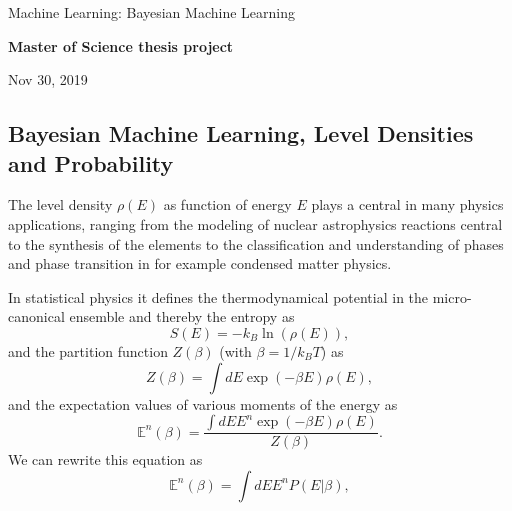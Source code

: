 \documentclass[%
oneside,                 %
final,                   %
10pt]{article}
\begin{document}

\newcommand{\exercisesection}[1]{\subsection*{#1}}






\thispagestyle{empty}

\begin{center}
{\LARGE\bf
\begin{spacing}{1.25}
Machine Learning: Bayesian Machine Learning
\end{spacing}
}
\end{center}


\begin{center}
{\bf Master of Science thesis project${}^{}$} \\ [0mm]
\end{center}

\begin{center}
\end{center}
    

\begin{center}
Nov 30, 2019
\end{center}

\vspace{1cm}


\subsection*{Bayesian Machine Learning, Level Densities and Probability}

The level density $\rho(E)$ as function of energy $E$ plays a central in many
physics applications, ranging from the modeling of nuclear
astrophysics reactions central to the synthesis of the elements to the
classification and understanding of phases and phase transition in for example condensed matter
physics.

In statistical physics it defines the thermodynamical potential in the micro-canonical ensemble and thereby the entropy as
\[
S(E) = -k_B \ln{(\rho(E))},
\]
and the partition function $Z(\beta)$ (with $\beta = 1/k_BT$)  as
\[
Z(\beta) = \int dE \exp{(-\beta E)}\rho(E),
\]
and the expectation values of various moments of the energy
as
\[
\mathbb{E}^n(\beta) = \frac{\int dE E^n\exp{(-\beta E)}\rho(E)}{Z(\beta)}. 
\]
We can rewrite this equation as
\[
\mathbb{E}^n(\beta) = \int dE E^n P(E\vert\beta), 
\]
\end{document}
